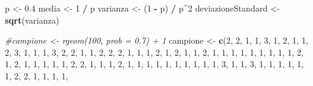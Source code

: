 \documentclass[]{book}
\newenvironment{Shaded}{\begin{snugshade}}{\end{snugshade}}
\newcommand{\KeywordTok}[1]{\textcolor[rgb]{0.13,0.29,0.53}{\textbf{#1}}}
\newcommand{\DecValTok}[1]{\textcolor[rgb]{0.00,0.00,0.81}{#1}}
\newcommand{\FloatTok}[1]{\textcolor[rgb]{0.00,0.00,0.81}{#1}}
\newcommand{\StringTok}[1]{\textcolor[rgb]{0.31,0.60,0.02}{#1}}
\newcommand{\CommentTok}[1]{\textcolor[rgb]{0.56,0.35,0.01}{\textit{#1}}}
\newcommand{\OperatorTok}[1]{\textcolor[rgb]{0.81,0.36,0.00}{\textbf{#1}}}
\newcommand{\NormalTok}[1]{#1}
\begin{document}
\begin{Shaded}
\begin{Highlighting}[]
\NormalTok{p <-}\StringTok{ }\FloatTok{0.4}
\NormalTok{media <-}\StringTok{ }\DecValTok{1} \OperatorTok{/}\StringTok{ }\NormalTok{p}
\NormalTok{varianza <-}\StringTok{ }\NormalTok{(}\DecValTok{1} \OperatorTok{-}\StringTok{ }\NormalTok{p) }\OperatorTok{/}\StringTok{ }\NormalTok{p}\OperatorTok{^}\DecValTok{2}
\NormalTok{deviazioneStandard <-}\StringTok{ }\KeywordTok{sqrt}\NormalTok{(varianza)}

\CommentTok{#campione <- rgeom(100, prob = 0.7) + 1}
\NormalTok{campione <-}\StringTok{ }\KeywordTok{c}\NormalTok{(}\DecValTok{2}\NormalTok{, }\DecValTok{2}\NormalTok{, }\DecValTok{1}\NormalTok{, }\DecValTok{1}\NormalTok{, }\DecValTok{3}\NormalTok{, }\DecValTok{1}\NormalTok{, }\DecValTok{2}\NormalTok{, }\DecValTok{1}\NormalTok{, }\DecValTok{1}\NormalTok{, }\DecValTok{2}\NormalTok{, }\DecValTok{3}\NormalTok{, }\DecValTok{1}\NormalTok{, }\DecValTok{1}\NormalTok{, }\DecValTok{1}\NormalTok{, }\DecValTok{3}\NormalTok{, }\DecValTok{2}\NormalTok{, }\DecValTok{2}\NormalTok{, }\DecValTok{1}\NormalTok{, }\DecValTok{1}\NormalTok{, }\DecValTok{2}\NormalTok{, }
              \DecValTok{2}\NormalTok{, }\DecValTok{2}\NormalTok{, }\DecValTok{1}\NormalTok{, }\DecValTok{1}\NormalTok{, }\DecValTok{1}\NormalTok{, }\DecValTok{2}\NormalTok{, }\DecValTok{1}\NormalTok{, }\DecValTok{2}\NormalTok{, }\DecValTok{1}\NormalTok{, }\DecValTok{1}\NormalTok{, }\DecValTok{2}\NormalTok{, }\DecValTok{1}\NormalTok{, }\DecValTok{1}\NormalTok{, }\DecValTok{1}\NormalTok{, }\DecValTok{1}\NormalTok{, }\DecValTok{1}\NormalTok{, }\DecValTok{1}\NormalTok{, }\DecValTok{1}\NormalTok{, }\DecValTok{1}\NormalTok{, }\DecValTok{1}\NormalTok{, }
              \DecValTok{2}\NormalTok{, }\DecValTok{1}\NormalTok{, }\DecValTok{2}\NormalTok{, }\DecValTok{1}\NormalTok{, }\DecValTok{1}\NormalTok{, }\DecValTok{1}\NormalTok{, }\DecValTok{1}\NormalTok{, }\DecValTok{1}\NormalTok{, }\DecValTok{2}\NormalTok{, }\DecValTok{2}\NormalTok{, }\DecValTok{1}\NormalTok{, }\DecValTok{1}\NormalTok{, }\DecValTok{1}\NormalTok{, }\DecValTok{2}\NormalTok{, }\DecValTok{1}\NormalTok{, }\DecValTok{1}\NormalTok{, }\DecValTok{1}\NormalTok{, }\DecValTok{1}\NormalTok{, }\DecValTok{1}\NormalTok{, }\DecValTok{1}\NormalTok{, }
              \DecValTok{1}\NormalTok{, }\DecValTok{1}\NormalTok{, }\DecValTok{1}\NormalTok{, }\DecValTok{1}\NormalTok{, }\DecValTok{3}\NormalTok{, }\DecValTok{1}\NormalTok{, }\DecValTok{1}\NormalTok{, }\DecValTok{3}\NormalTok{, }\DecValTok{1}\NormalTok{, }\DecValTok{1}\NormalTok{, }\DecValTok{1}\NormalTok{, }\DecValTok{1}\NormalTok{, }\DecValTok{1}\NormalTok{, }\DecValTok{1}\NormalTok{, }\DecValTok{2}\NormalTok{, }\DecValTok{2}\NormalTok{, }\DecValTok{1}\NormalTok{, }\DecValTok{1}\NormalTok{, }\DecValTok{1}\NormalTok{, }\DecValTok{1}\NormalTok{, }

\end{Highlighting}
\end{Shaded}
\end{document}
